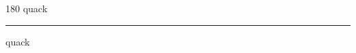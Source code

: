 
\begin{frame}
\begin{center}
\begin{turn}{180}
{\fontsize{2.5cm}{1em}\selectfont quack}
\end{turn}
\vspace{1em}\par  
\hrule
\vspace{1em}\par  
{\fontsize{2.5cm}{1em}\selectfont quack}
\end{center}
\end{frame}
